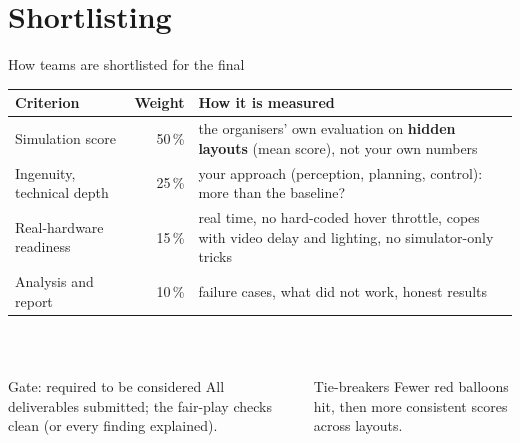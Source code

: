 \documentclass[aspectratio=169,11pt]{beamer}
\begin{document}
\section{Shortlisting}
\begin{frame}{How teams are shortlisted for the final}
  \centering\small
  \begin{tabular}{@{}p{4.2cm}r p{7.6cm}@{}}
    \toprule
    \textbf{Criterion} & \textbf{Weight} & \textbf{How it is measured} \\
    \midrule
    Simulation score & 50\,\% & the organisers' own evaluation on
      \textbf{hidden layouts} (mean score), not your own numbers \\
    Ingenuity, technical depth & 25\,\% & your approach (perception,
      planning, control): more than the baseline? \\
    Real-hardware readiness & 15\,\% & real time, no hard-coded hover
      throttle, copes with video delay and lighting, no simulator-only tricks \\
    Analysis and report & 10\,\% & failure cases, what did not work,
      honest results \\
    \bottomrule
  \end{tabular}\\[4mm]
  \begin{columns}[T]
    \begin{block}{Gate: required to be considered}
      \footnotesize All deliverables submitted; the fair-play checks clean
      (or every finding explained).
    \end{block}
    \begin{block}{Tie-breakers}
      \footnotesize Fewer red balloons hit, then more consistent scores
      across layouts.
    \end{block}
  \end{columns}
\end{frame}

\end{document}
